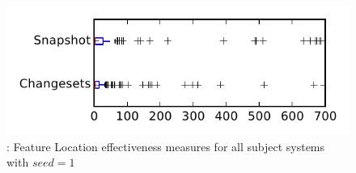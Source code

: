 
\begin{figure}
\centering
\includegraphics[height=0.4\textheight]{figures/flt_seed/rq1_tiny_1}
\caption{\rone: Feature Location effectiveness measures for all subject systems with $seed=1$}
\label{fig:flt_seed:rq1:tiny}
\end{figure}
